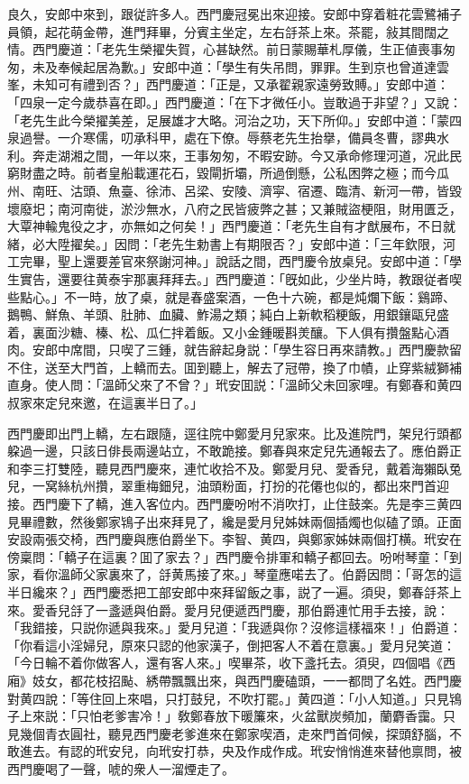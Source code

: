 良久，安郎中來到，跟従許多人。西門慶冠冕出來迎接。安郎中穿着粧花雲鷺補子員領，起花萌金帶，進門拜畢，分賓主坐定，左右㧱茶上來。茶罷，敍其間闊之情。西門慶道：「老先生榮擢失賀，心甚缺然。前日蒙賜華札厚儀，生正値喪事匆匆，未及奉候起居為歉。」安郎中道：「學生有失吊問，罪罪。生到京也曾道達雲峯，未知可有禮到否？」西門慶道：「正是，又承翟親家遠勞致賻。」安郎中道：「四泉一定今歲恭喜在即。」西門慶道：「在下才微任小。豈敢過于非望？」又說：「老先生此今榮擢美差，足展雄才大略。河治之功，天下所仰。」安郎中道：「蒙四泉過譽。一介寒儒，叨承科甲，處在下僚。辱蔡老先生抬擧，備員冬曹，謬典水利。奔走湖湘之間，一年以來，王事匆匆，不暇安跡。今又承命修理河道，况此民窮財盡之時。前者皇船載運花石，毀閘折壩，所過倒懸，公私困弊之極；而今瓜州、南旺、沽頭、魚臺、徐沛、呂梁、安陵、濟寜、宿遷、臨清、新河一帶，皆毀壞廢圯；南河南徙，淤沙無水，八府之民皆疲弊之甚；又兼賊盜梗阻，財用匱乏，大覃神輸鬼役之才，亦無如之何矣！」西門慶道：「老先生自有才猷展布，不日就緒，必大陞擢矣。」因問：「老先生勅書上有期限否？」安郎中道：「三年欽限，河工完畢，聖上還要差官來祭謝河神。」說話之間，西門慶令放桌兒。安郎中道：「學生實告，還要往黄泰宇那裏拜拜去。」西門慶道：「旣如此，少坐片時，教跟従者喫些點心。」不一時，放了桌，就是春盛案酒，一色十六碗，都是炖爛下飯：鷄蹄、鵝鴨、鮮魚、羊頭、肚肺、血臟、鮓湯之類；純白上新軟稻粳飯，用銀鑲甌兒盛着，裏面沙糖、榛、松、瓜仁拌着飯。又小金鍾暖斟羙釀。下人俱有攢盤點心酒肉。安郎中席間，只喫了三鍾，就告辭起身説：「學生容日再來請教。」西門慶款留不住，送至大門首，上轎而去。囬到聽上，解去了冠帶，換了巾幘，止穿紫絨獅補直身。使人問：「溫師父來了不曾？」玳安囬説：「溫師父未回家哩。有鄭春和黄四叔家來定兒來邀，在這裏半日了。」

西門慶即出門上轎，左右跟隨，逕往院中鄭愛月兒家來。比及進院門，架兒行頭都躱過一邊，只該日俳長兩邊站立，不敢跪接。鄭春與來定兒先通報去了。應伯爵正和李三打雙陸，聽見西門慶來，連忙收拾不及。鄭愛月兒、愛香兒，戴着海獺臥兔兒，一窝絲杭州攢，翠重梅鈿兒，油頭粉面，打扮的花僊也似的，都出來門首迎接。西門慶下了轎，進入客位内。西門慶吩咐不消吹打，止住鼓楽。先是李三黄四見畢禮數，然後鄭家鴇子出來拜見了，纔是愛月兒姊妹兩個插燭也似磕了頭。正面安設兩張交椅，西門慶與應伯爵坐下。李智、黄四，與鄭家姊妹兩個打横。玳安在傍稟問：「轎子在這裏？囬了家去？」西門慶令排軍和轎子都回去。吩咐琴童：「到家，看你溫師父家裏來了，㧱黄馬接了來。」琴童應喏去了。伯爵因問：「哥怎的這半日纔來？」西門慶悉把工部安郎中來拜留飯之事，説了一遍。須臾，鄭春㧱茶上來。愛香兒㧱了一盞遞與伯爵。愛月兒便遞西門慶，那伯爵連忙用手去接，說：「我錯接，只説你遞與我來。」愛月兒道：「我遞與你？沒修這樣福來！」伯爵道：「你看這小淫婦兒，原來只認的他家漢子，倒把客人不着在意裏。」愛月兒笑道：「今日輪不着你做客人，還有客人來。」喫畢茶，收下盞托去。須臾，四個唱《西廂》妓女，都花枝招颭、綉帶飄飄出來，與西門慶磕頭，一一都問了名姓。西門慶對黄四說：「等住回上來唱，只打鼓兒，不吹打罷。」黄四道：「小人知道。」只見鴇子上來説：「只怕老爹害冷！」敎鄭春放下暖簾來，火盆獸炭頻加，蘭麝香靄。只見幾個青衣圓社，聽見西門慶老爹進來在鄭家喫酒，走來門首伺候，探頭舒腦，不敢進去。有認的玳安兒，向玳安打恭，央及作成作成。玳安悄悄進來替他禀問，被西門慶喝了一聲，唬的衆人一溜煙走了。


